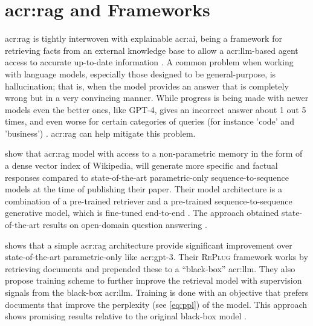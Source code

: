 \section[Retrieval Augmented Generation and Frameworks]{\acrlong{acr:rag} and Frameworks}\label{sec:retrieval-automented-generation}

\gls{acr:rag} is tightly interwoven with explainable \acrshort{acr:ai}, being a framework for retrieving facts from an external knowledge base to allow a \acrshort{acr:llm}-based agent access to accurate up-to-date information \citep{martineauWhatRetrievalaugmentedGeneration2023}. A common problem when working with language models, especially those designed to be general-purpose, is hallucination; that is, when the model provides an answer that is completely wrong but in a very convincing manner. While progress is being made with newer models even the better ones, like GPT-4, gives an incorrect answer about 1 out 5 times, and even worse for certain categories of queries (for instance 'code' and 'business') \citep[10]{openaiGPT4TechnicalReport2023}. \acrlong{acr:rag} can help mitigate this problem.

\cite{lewisRetrievalAugmentedGenerationKnowledgeIntensive2020} show that \gls{acr:rag} model with access to a non-parametric memory in the form of a dense vector index of Wikipedia, will generate more specific and factual responses compared to state-of-the-art parametric-only sequence-to-sequence models at the time of publishing their paper. Their model architecture is a combination of a pre-trained retriever and a pre-trained sequence-to-sequence generative model, which is fine-tuned end-to-end \citep[2]{lewisRetrievalAugmentedGenerationKnowledgeIntensive2020}. The approach obtained state-of-the-art results on open-domain question answering \citep[5-6]{lewisRetrievalAugmentedGenerationKnowledgeIntensive2020}.

\cite{shiREPLUGRetrievalAugmentedBlackBox2023} shows that a simple \gls{acr:rag} architecture provide significant improvement over state-of-the-art parametric-only  like \acrshort{acr:gpt}-3. Their \textsc{RePlug} framework works by retrieving documents and prepended these to a \enquote{black-box} \acrshort{acr:llm}. They also propose training scheme to further improve the retrieval model with supervision signals from the black-box \acrshort{acr:llm}. Training is done with an objective that prefers documents that improve the perplexity (see \eqref{eq:ppl}) of the model. This approach shows promising results relative to the original black-box model \citep[5-6]{shiREPLUGRetrievalAugmentedBlackBox2023}.

